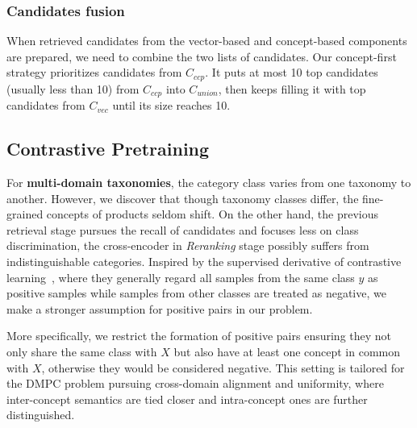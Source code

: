 \subsubsection{Candidates fusion} 
When retrieved candidates from the vector-based and concept-based components are prepared, we need to combine the two lists of candidates. Our concept-first strategy prioritizes candidates from ${C_{ccp}}$. It puts at most 10 top candidates (usually less than 10) from $C_{ccp}$ into $C_{union}$, then keeps filling it with top candidates from $C_{vec}$ 
until its size reaches 10.


\subsection{Contrastive Pretraining}
For \textbf{multi-domain taxonomies}, the category class varies from one taxonomy to another. 
However, we discover that though taxonomy classes differ, the fine-grained concepts of products seldom shift. 
On the other hand, the previous retrieval stage pursues the recall of candidates and focuses less on class discrimination, the cross-encoder in \textit{Reranking} stage possibly suffers from indistinguishable categories.
Inspired by the 
supervised derivative of contrastive learning~\cite{wang2021self}, where they generally regard all samples from the same class $y$ as positive samples while samples from other classes are treated as negative, we make a stronger assumption for positive pairs in our problem.

More specifically, 
we restrict the formation of positive pairs ensuring they not only share the same class with $X$ but also have at least one concept in common with $X$, otherwise they would be considered negative. 
This setting is tailored for the DMPC problem pursuing cross-domain alignment and uniformity, 
where inter-concept semantics are tied closer and intra-concept ones are further distinguished.

